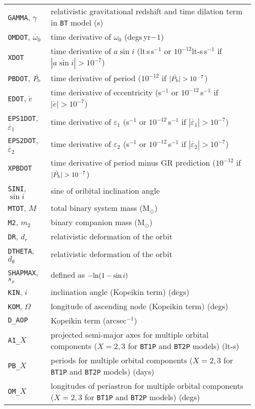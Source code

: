 \begin{longtable}{l|l}
{\tt GAMMA}, $\gamma$ & relativistic gravitational redshift and time dilation term in {\tt BT} model (s) \\
{\tt OMDOT}, $\dot{\omega_0}$ & time derivative of $\omega_0$ (degs\,yr${-1}$) \\
{\tt XDOT} & time derivative of $a\sin{i}$ (lt\,s\,s$^{-1}$ or $10^{-12}$lt-s\,s$^{-1}$ if $|\dot{a\sin{i}}| > 10^{-7}$)  \\
{\tt PBDOT}, $\dot{P_{\rm b}}$ & time derivative of period ($10^{-12}$ if $|\dot{P_{\rm b}}| > 10^{-7}$) \\
{\tt EDOT}, $\dot{e}$ & time derivative of eccentricity (s$^{-1}$ or $10^{-12}$\,s$^{-1}$ if $|\dot{e}| > 10^{-7}$) \\
{\tt EPS1DOT}, $\dot{\varepsilon_1}$ & time derivative of $\varepsilon_1$ (s$^{-1}$ or $10^{-12}$\,s$^{-1}$ if $|\dot{\varepsilon_1}| > 10^{-7}$) \\
{\tt EPS2DOT}, $\dot{\varepsilon_2}$ & time derivative of $\varepsilon_2$ (s$^{-1}$ or $10^{-12}$\,s$^{-1}$ if $|\dot{\varepsilon_2}| > 10^{-7}$) \\
{\tt XPBDOT} & time derivative of period minus GR prediction ($10^{-12}$ if $|\dot{P_{\rm b}}| > 10^{-7}$) \\
{\tt SINI}, $\sin{i}$ & sine of oribital inclination angle \\
{\tt MTOT}, $M$ & total binary system mass (M$_{\odot}$) \\
{\tt M2}, $m_2$ & binary companion mass (M$_{\odot}$) \\
{\tt DR}, $d_r$ & relativistic deformation of the orbit \\
{\tt DTHETA}, $d_{\theta}$ & relativistic deformation of the orbit \\
{\tt SHAPMAX}, $s_x$ & defined as $-{\rm ln}(1-\sin{i})$ \\
{\tt KIN}, $i$ & inclination angle (Kopeikin term) (degs) \\
{\tt KOM}, $\Omega$ & longitude of ascending node (Kopeikin term) (degs) \\
{\tt D\_AOP} & Kopeikin term (arcsec$^{-1}$) \citep[see e.g.\ Section~2.7.1 of][]{2006MNRAS.372.1549E} \\
{\tt A1\_}$X$ & projected semi-major axes for multiple orbital components ($X=2,3$ for {\tt BT1P} and {\tt BT2P} models) (lt-s) \\
{\tt PB\_}$X$ & periods for multiple orbital components ($X=2,3$ for {\tt BT1P} and {\tt BT2P} models) (days) \\
{\tt OM\_}$X$ & longitudes of periastron for multiple orbital components ($X=2,3$ for {\tt BT1P} and {\tt BT2P} models) (degs) \\

\end{longtable}
